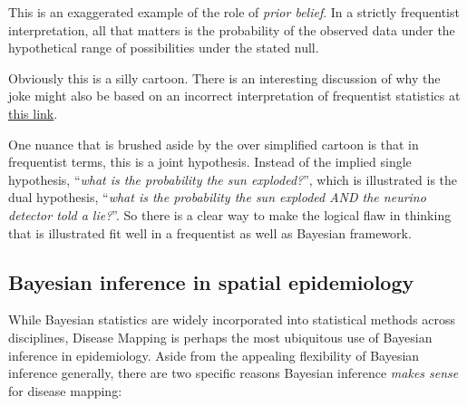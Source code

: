 \documentclass[
]{book}
\newenvironment{rmdnote}[1]
  {
  \begin{itemize}
  \renewcommand{\labelitemi}{
    \raisebox{-.7\height}[0pt][0pt]{
      {\setkeys{Gin}{width=3em,keepaspectratio}\texttt{[image: images/\#1]}}
    }
  }
  \setlength{\fboxsep}{1em}
  \begin{note}
  \item
  }
  {
  \end{note}
  \end{itemize}
  }
\begin{document}
This is an exaggerated example of the role of \emph{prior belief}. In a strictly frequentist interpretation, all that matters is the probability of the observed data under the hypothetical range of possibilities under the stated null.

\begin{rmdnote}{note}
Obviously this is a silly cartoon. There is an interesting discussion of why the joke might also be based on an incorrect interpretation of frequentist statistics at \href{https://statmodeling.stat.columbia.edu/2012/11/10/16808/}{this link}.

One nuance that is brushed aside by the over simplified cartoon is that in frequentist terms, this is a joint hypothesis. Instead of the implied single hypothesis, ``\emph{what is the probability the sun exploded?}'', which is illustrated is the dual hypothesis, ``\emph{what is the probability the sun exploded AND the neurino detector told a lie?}''. So there is a clear way to make the logical flaw in thinking that is illustrated fit well in a frequentist as well as Bayesian framework.

\end{rmdnote}

\hypertarget{bayesian-inference-in-spatial-epidemiology}{%
\subsection{Bayesian inference in spatial epidemiology}\label{bayesian-inference-in-spatial-epidemiology}}

While Bayesian statistics are widely incorporated into statistical methods across disciplines, Disease Mapping is perhaps the most ubiquitous use of Bayesian inference in epidemiology. Aside from the appealing flexibility of Bayesian inference generally, there are two specific reasons Bayesian inference \emph{makes sense} for disease mapping:
\end{document}
